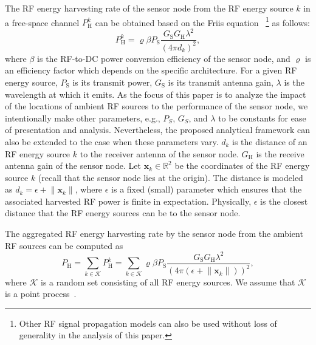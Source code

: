 \documentclass[12pt,draftclsnofoot,onecolumn]{IEEEtran}
\begin{document}
The RF energy harvesting rate of the sensor node from the RF energy source $k$ in a free-space channel $P^{k}_{\mathrm{H}}$ can be obtained based on the Friis equation~\cite{Visser2013} \footnote{Other RF signal propagation models can also be used without loss of generality in the analysis of this paper.} as follows: 
\begin{equation}
\label{eq:harvestedRFpower}
	P^{k}_{\mathrm{H}}	= \varrho \beta P_{\mathrm{S}} \frac{G_{\mathrm{S}} G_{\mathrm{H}} \lambda^{2}}{(4\pi d_{k})^{2}},
\end{equation}
where $\beta$ is the RF-to-DC power conversion efficiency of the sensor node, and $\varrho$ is an efficiency factor which depends on the specific architecture.
For a given RF energy source, $P_{\mathrm{S}}$ is its transmit power, $G_{\mathrm{S}}$ is its transmit antenna gain, $\lambda$ is the wavelength at which it emits. As the focus of this paper is to analyze the impact of the locations of ambient RF sources to the performance of the sensor node, we intentionally make other parameters, e.g., $P_S$, $G_S$, and $\lambda$ to be constants for ease of presentation and analysis. Nevertheless, the proposed analytical framework can also be extended to the case when these parameters vary. $d_{k}$ is the distance of an RF energy source $k$ to the receiver antenna of the sensor node. $G_{\mathrm{H}}$ is the receive antenna gain of  the sensor node. Let ${\mathbf{x}}_k \in {\mathbb{R}}^2$ be the coordinates of the RF energy source $k$ (recall that the sensor node lies at the origin). The distance is modeled as $d_{k} = \epsilon + \lVert{\mathbf{x}}_k	\rVert$, where $\epsilon$ is a fixed (small) parameter which ensures that the associated harvested RF power is finite in expectation. Physically, $\epsilon$ is the closest distance that the RF energy sources can be to the sensor node.

The aggregated RF energy harvesting rate by the sensor node from the ambient RF sources can be computed as
\begin{equation}
\label{eq:totalamountofpower}
	P_{\mathrm{H}} = \sum_{ k \in {\mathcal{K}} } P^{k}_{\mathrm{H}}	=	\sum_{ k \in {\mathcal{K}} }	\varrho \beta P_{\mathrm{S}} \frac{G_{\mathrm{S}} G_{\mathrm{H}} \lambda^{2}}{(4\pi 	(\epsilon + \lVert {\mathbf{x}}_k \rVert)	)^{2}} ,
\end{equation}
where ${\mathcal{K}}$ is a random set consisting of all RF energy sources. We assume that $\mathcal{K}$ is a point process~\cite{Kallenberg}.
 
\end{document}
